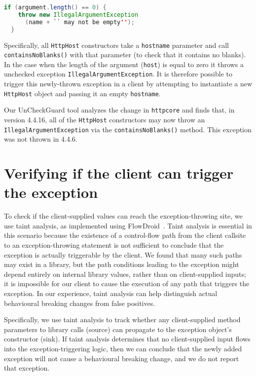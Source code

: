 \begin{lstlisting}[language=Java]
  if (argument.length() == 0) {
    throw new IllegalArgumentException
      (name + `` may not be empty'');
  }
\end{lstlisting}

Specifically, all \texttt{HttpHost} constructors take a \texttt{hostname} parameter and call \texttt{containsNoBlanks()}
with that parameter (to check that it contains no blanks). In the case when the length of the argument (\texttt{host}) is equal to zero it throws a unchecked exception \texttt{IllegalArgumentException}. It is therefore possible to trigger this newly-thrown
exception in a client by attempting to instantiate a new \texttt{HttpHost} object and passing it an empty
\texttt{hostname}.

Our UnCheckGuard tool analyzes the change in \texttt{httpcore} and finds that, in
version 4.4.16, all of the \texttt{HttpHost} constructors may now throw an
\texttt{IllegalArgumentException} via the \texttt{containsNoBlanks()} method.
This exception was not thrown in 4.4.6.



\section{Verifying if the client can trigger the exception} 

To check if the client-supplied values can reach the exception-throwing site, we use taint analysis, as implemented using FlowDroid~\cite{Arzt14:_flowdroid}. Taint analysis is essential in this scenario because the existence of a control-flow path from the client callsite to an exception-throwing statement is not sufficient to conclude that the exception is actually triggerable by the client. We found that many such paths may exist in a library, but the path conditions leading to the exception might depend entirely on internal library values, rather than on client-supplied inputs; it is impossible for our client to cause the execution of any path that triggers the exception. In our experience, taint analysis can help distinguish actual behavioural breaking changes from false positives.

Specifically, we use taint analysis to track whether any client-supplied method parameters to library calls (source) can propagate to the exception object's constructor (sink). If taint analysis determines that no client-supplied input flows into the exception-triggering logic, then we can conclude that the newly added exception will not cause a behavioural breaking change, and we do not report that exception.

